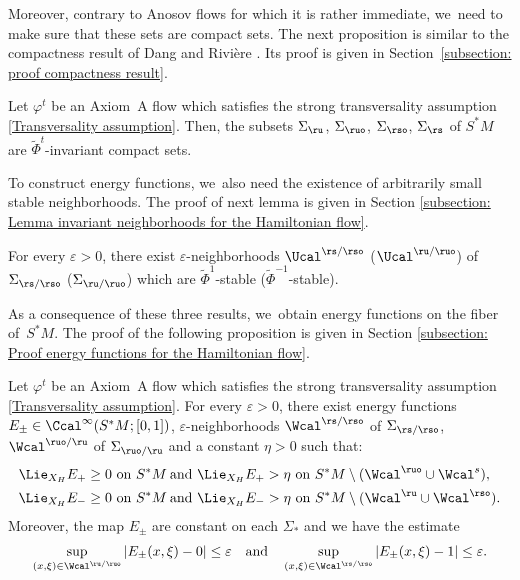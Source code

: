 Moreover, contrary to Anosov flows for which it is rather immediate, we~need to make sure that these sets are compact sets. The next proposition is similar to the compactness result of Dang and Rivière \cite[Lem.\,3.7, p.\,15]{DR0}. Its proof is given in Section~\ref{subsection: proof compactness result}.

\begin{prop}[Compactness]\label{prop compactness}Let $\varphi^t$ be an Axiom~A flow which satisfies the strong transversality assumption \eqref{Transversality assumption}. Then, the subsets
$\Sigma_{\ru}$, $\Sigma_{\ruo}$, $\Sigma_{\rso}$, $\Sigma_{\rs}$ of $S^*M$ are $\widetilde{\Phi}^t$-invariant compact sets.
\end{prop}

To construct energy functions, we~also need the existence of arbitrarily small stable neighborhoods. The proof of next lemma is given in Section  \ref{subsection: Lemma invariant neighborhoods for the Hamiltonian flow}.

\begin{lemma}\label{lemma invariant neighborhoods}
For every $\varepsilon > 0$, there exist $\varepsilon$-neighborhoods $\Ucal^{\rs/\rso}$ (\resp $\Ucal^{\ru/\ruo}$) of $\Sigma_{\rs/\rso}$ (\resp $\Sigma_{\ru/\ruo}$) which are $\widetilde{\Phi}^{1}$-stable (\resp $\widetilde{\Phi}^{-1}$-stable).
\end{lemma}

As a consequence of these three results, we~obtain energy functions on the fiber of~$S^* M$. The proof of the following proposition is given in Section \ref{subsection: Proof energy functions for the Hamiltonian flow}.

\skpt
\begin{prop}\label{prop energy function on the unitary cotangent bundle}
Let $\varphi^t$ be an Axiom~A flow which satisfies the strong transversality assumption \eqref{Transversality assumption}. For every $\varepsilon > 0$, there exist energy functions $E_{\pm} \in \Ccal^{\infty}(S^* M; [0,1])$, $\varepsilon$\nobreakdash-neighborhoods $\Wcal^{\rs/\rso}$ of $\Sigma_{\rs/\rso}$, $\Wcal^{\ruo/\ru}$ of $\Sigma_{\ruo/\ru}$ and a constant $\eta > 0$ such that:
\begin{align*}
\begin{split}
\Lie_{X_H} E_{+} &\geq 0 \text{ on } S^* M \: \text{and } \Lie_{X_H} E_{+} > \eta \text{ on } S^* M \setminus (\Wcal^{\ruo} \cup \Wcal^{s}), \\
\Lie_{X_H} E_{-} &\geq 0 \text{ on } S^* M \: \text{and } \Lie_{X_H} E_{-} > \eta \text{ on } S^* M \setminus (\Wcal^{\ru} \cup \Wcal^{\rso}).
\end{split}
\end{align*}
Moreover, the map $E_{\pm}$ are constant on each $\Sigma_{*}$ and we have the estimate
\begin{align*}
\sup_{(x,\xi) \in \Wcal^{\ru/\ruo}} \left| E_{\pm}(x,\xi) - 0 \right| \leq \varepsilon \quad \text{and} \quad \sup_{(x,\xi) \in \Wcal^{\rs/\rso}} \left| E_{\pm}(x,\xi) - 1 \right| \leq \varepsilon.
\end{align*}
\end{prop}

